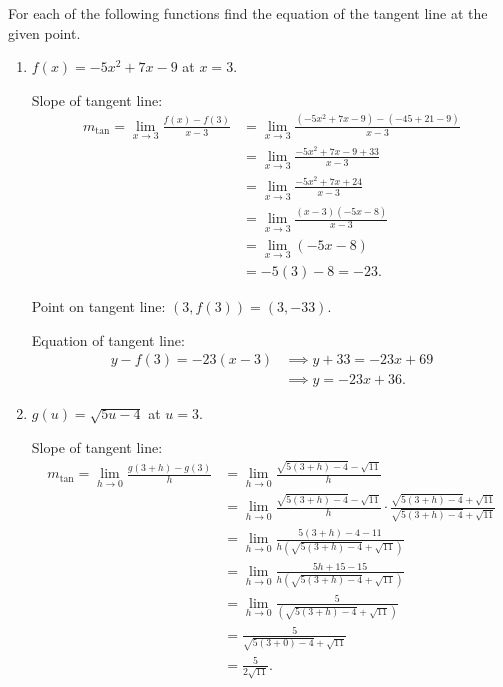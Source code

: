 \documentclass[nooutcomes]{ximera}
\begin{document}
\begin{problem}
 For each of the following functions find the equation of the tangent line at the given point.
  \begin{enumerate}
    \item
      $f(x) = -5x^2 + 7x - 9$ at $x = 3$.
      \begin{freeResponse}
        Slope of tangent line:
        \begin{align*}
          m_{\mathrm{tan}} = \lim_{x \to 3} \frac{f(x) -f(3)}{x-3}
		&= \lim_{x \to 3} \frac{(-5x^2 + 7x - 9) - (-45 + 21 - 9)}{x-3}  \\
		&= \lim_{x \to 3} \frac{-5x^2 + 7x - 9 + 33}{x-3}  \\
		&= \lim_{x \to 3} \frac{-5x^2 + 7x + 24}{x-3}  \\
		&= \lim_{x \to 3} \frac{(x-3)(-5x -8)}{x-3}  \\
		&= \lim_{x \to 3} (-5x - 8)  \\
		&= -5(3) - 8 = -23.
	\end{align*}
        
        Point on tangent line: $(3, f(3)) = (3, -33)$.

        Equation of tangent line:
        \begin{align*}
          y - f(3) = -23(x-3) &\implies y + 33 = -23x + 69\\
          &\implies y = -23x + 36.
        \end{align*}
      \end{freeResponse}

    \item
      $g(u) = \sqrt{5u-4}$ at $u = 3$.
      \begin{freeResponse}
        Slope of tangent line:
        \begin{align*}
          m_{\mathrm{tan}} = \lim_{h \to 0} \frac{g(3+h) - g(3)}{h}
            &= \lim_{h \to 0} \frac{\sqrt{5(3+h) - 4} - \sqrt{11}}{h}\\
          		&=\lim_{h \to 0} \frac{\sqrt{5(3+h) - 4} - \sqrt{11}}{h} \cdot \frac{\sqrt{5(3+h) - 4} + \sqrt{11}}{\sqrt{5(3+h) - 4} + \sqrt{11}} \\
		&= \lim_{h \to 0} \frac{5(3+h) - 4 - 11}{h \left( \sqrt{5(3+h) - 4} + \sqrt{11} \right) }  \\
		&= \lim_{h \to 0} \frac{5h + 15 - 15}{h \left( \sqrt{5(3+h) - 4} + \sqrt{11} \right) }  \\
		&= \lim_{h \to 0} \frac{5}{\left( \sqrt{5(3+h) - 4} + \sqrt{11} \right) }  \\
		&= \frac{5}{\sqrt{5(3+0) - 4} + \sqrt{11}}  \\
		&= \frac{5}{2 \sqrt{11}}.
        \end{align*}


\end{freeResponse}
\end{enumerate}
\end{problem}
\end{document}
